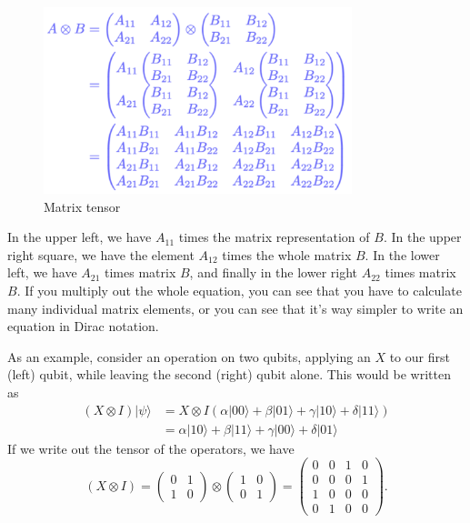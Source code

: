 \begin{figure}[H]
    \centering
    \includegraphics[width=0.8\textwidth]{lesson2/matrix_tensor.pdf}
    
        \caption{Matrix tensor}
    
    \label{fig:tensor-unused}
\end{figure}
\fi


In the upper left, we have $A_{11}$ times the matrix representation of $B$. In the upper right square, we have the element $A_{12}$ times the whole matrix $B$. In the lower left, we have  $A_{21}$ times matrix $B$, and finally in the lower right $A_{22}$ times matrix $B$. If you multiply out the whole equation, you can see that you have to calculate many individual matrix elements, or you can see that it's way simpler to write an equation in Dirac notation.

As an example, consider an operation on two qubits, applying an $X$ to our first (left) qubit, while leaving the second (right) qubit alone. This would be written as
\begin{equation}
\begin{aligned}
(X \otimes I)|\psi\rangle &=X \otimes I(\alpha|00\rangle+\beta|01\rangle+\gamma|10\rangle+\delta|11\rangle) \\
&=\alpha|10\rangle+\beta|11\rangle+\gamma|00\rangle+\delta|01\rangle
\end{aligned}
\end{equation}
If we write out the tensor of the operators, we have
\begin{equation}
(X \otimes I)=\left(\begin{array}{ll}
0 & 1 \\
1 & 0
\end{array}\right) \otimes\left(\begin{array}{ll}
1 & 0 \\
0 & 1
\end{array}\right)=\left(\begin{array}{llll}
0 & 0 & 1 & 0 \\
0 & 0 & 0 & 1 \\
1 & 0 & 0 & 0 \\
0 & 1 & 0 & 0
\end{array}\right).
\end{equation}

